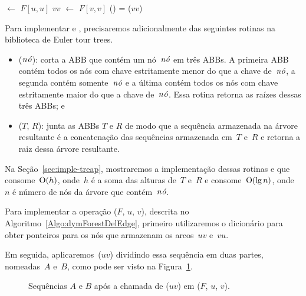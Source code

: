 \begin{algorithm}[htb]
\caption{\dymForestQuery($F$, $u$, $v$)}
\label{Algo:dymForestQuery}
\begin{algorithmic}[1]
\State {} $\gets$ $F[u,u]$
\State $vv$ $\gets$ $F[v,v]$
\State \Return \treapGetRoot() = \treapGetRoot($vv$)
\end{algorithmic}
\end{algorithm}

Para implementar \dymForestAddEdge{} e \dymForestDelEdge{}, precisaremos adicionalmente das seguintes rotinas na biblioteca de Euler tour trees. 
\begin{itemize}
\item \treapSplit($\mathit{n\acute{o}}$): corta a ABB que contém um nó~$\mathit{n\acute{o}}$ em três ABBs. A primeira ABB contém todos os nós com chave estritamente menor do que a chave de~$\mathit{n\acute{o}}$, a segunda contém somente~$\mathit{n\acute{o}}$ e a última contém todos os nós com chave estritamente maior do que a chave de~$\mathit{n\acute{o}}$. Essa rotina retorna as raízes dessas três ABBs; e
\item \treapJoin($T$, $R$): junta as ABBs $T$ e $R$ de modo que a sequência armazenada na árvore resultante é a concatenação das sequências armazenada em~$T$ e~$R$ e retorna a raiz dessa árvore resultante.
\end{itemize}

Na Seção~\ref{sec:imple-treap}, mostraremos a implementação dessas rotinas e que~\treapJoin{} consome~$\mathrm{O}(h)$, onde~$h$ é a soma das alturas de~$T$ e~$R$ e \treapSplit{} consome~$\mathrm{O}(\lg n)$, onde~$n$ é número de nós da árvore que contém~$\mathit{n\acute{o}}$.

Para implementar a operação \dymForestDelEdge($F$, $u$, $v$), descrita no Algoritmo~\ref{Algo:dymForestDelEdge}, 
primeiro utilizaremos o dicionário para obter ponteiros para os nós que armazenam os arcos~$uv$ e~$vu$.

Em seguida, aplicaremos~\treapSplit($uv$) dividindo essa sequência em duas partes, nomeadas~$A$ e~$B$, como pode ser visto na Figura~\ref{fig:algorit-cut-seqxy}.
\begin{figure}[htb]
\centering

\caption{Sequências $A$ e $B$ após a chamada de \treapSplit($uv$) em \dymForestDelEdge($F$, $u$, $v$).}
\label{fig:algorit-cut-seqxy}
\end{figure}

